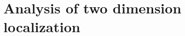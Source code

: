 \documentclass[10pt,conference,compsocconf,letterpaper]{IEEEtran}
\begin{document}
\section{Analysis of two dimension localization}
\end{document}
